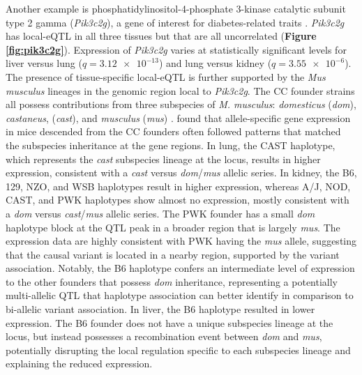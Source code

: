 \documentclass[9pt,twocolumn,twoside]{gsajnl}
\begin{document}
Another example is phosphatidylinositol-4-phosphate 3-kinase catalytic subunit type 2 gamma (\textit{Pik3c2g}), a gene of interest for diabetes-related traits \citep{Braccini2015}. \textit{Pik3c2g} has local-eQTL in all three tissues but that are all uncorrelated (\textbf{Figure \ref{fig:pik3c2g}}). Expression of \textit{Pik3c2g} varies at statistically significant levels for liver versus lung ($q = \num{3.12e-13}$) and lung versus kidney ($q = \num{3.55e-6}$). The presence of tissue-specific local-eQTL is further supported by the \textit{Mus musculus} lineages in the genomic region local to \textit{Pik3c2g}. The CC founder strains all possess contributions from three subspecies of \textit{M. musculus}: \textit{domesticus} (\textit{dom}), \textit{castaneus}, (\textit{cast}), and \textit{musculus} (\textit{mus}) \citep{Yang2011}. \cite{Crowley2015} found that allele-specific gene expression in mice descended from the CC founders often followed patterns that matched the subspecies inheritance at the gene regions.
In lung, the CAST haplotype, which represents the \textit{cast} subspecies lineage at the locus, results in higher expression, consistent with a \textit{cast} versus \textit{dom}/\textit{mus} allelic series. In kidney, the B6, 129, NZO, and WSB haplotypes result in higher expression, whereas A/J, NOD, CAST, and PWK haplotypes show almost no expression, mostly consistent with a \textit{dom} versus \textit{cast}/\textit{mus} allelic series. The PWK founder has a small \textit{dom} haplotype block at the QTL peak in a broader region that is largely \textit{mus}. The expression data are highly consistent with PWK having the \textit{mus} allele, suggesting that the causal variant is located in a nearby region, supported by the variant association. Notably, the B6 haplotype confers an intermediate level of expression to the other founders that possess \textit{dom} inheritance, representing a potentially multi-allelic QTL that haplotype association can better identify in comparison to bi-allelic variant association. In liver, the B6 haplotype resulted in lower expression. The B6 founder does not have a unique subspecies lineage at the locus, but instead possesses a recombination event between \textit{dom} and \textit{mus}, potentially disrupting the local regulation specific to each subspecies lineage and explaining the reduced expression.

\end{document}
